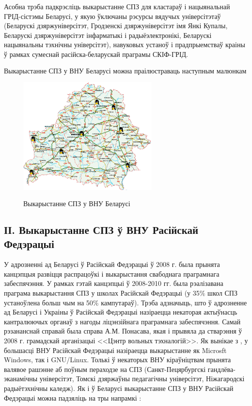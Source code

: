 \documentclass[10pt, a5paper]{article}
\begin{document}
Асобна трэба падкрэсліць выкарыстанне СПЗ для кластараў і нацыянальнай ГРІД-сістэмы Беларусі, у якую ўключаны рэсурсы вядучых універсітэтаў (Беларускі дзяржуніверсітэт, Гродзенскі дзяржуніверсітэт імя Янкі Купалы, Беларускі дзяржуніверсітэт інфарматыкі і радыёэлектронікі, Беларускі нацыянальны тэхнічны універсітэт), навуковых устаноў і прадпрыемстваў краіны ў рамках сумеснай расійска-беларускай праграмы СКІФ-ГРІД.

Выкарыстанне СПЗ у ВНУ Беларусі можна праілюстраваць наступным малюнкам

\begin{figure}[htpb]
  \centering
  \includegraphics[width=7cm]{03_2012_bilorus}
  \label{fig:Zlobin1}
  \caption{Выкарыстанне СПЗ у ВНУ Беларусі}
\end{figure}


\subsection*{ІІ. Выкарыстанне СПЗ ў ВНУ Расійскай Федэрацыі}

У адрозненні ад Беларусі ў Расійскай Федэрацыі ў 2008 г. была прынята канцэпцыя развіцця распрацоўкі і выкарыстання свабоднага праграмнага забеспячэння. У рамках гэтай канцэпцыі ў 2008-2010 гг. была рэалізавана праграма выкарыстання СПЗ у школах Расійскай Федэрацыі (у 35\% школ СПЗ устаноўлена больш чым на 50\% кампутараў). Трэба адзначыць, што ў адрозненне ад Беларусі і Украіны ў Расійскай Федэрацыі назіраецца некаторая актыўнасць кантралюючых органаў з нагоды ліцэнзійнага праграмнага забеспячэння. Самай рэзананснай справай была справа А.М. Понасава, якая і прывяла да стварэння ў 2008 г. грамадскай арганізацыі <<Цэнтр вольных тэхналогій>>. Як вынікае з  \cite{Zlobin1, Zlobin2, Zlobin3}, у большасці ВНУ Расійскай Федэрацыі назіраецца выкарыстанне як Microsft Windows, так і GNU/Linux. Толькі ў некаторых ВНУ кіраўніцтвам прынята валявое рашэнне аб поўным пераходзе на СПЗ (Санкт-Пецярбургскі гандлёва-эканамічны універсітэт, Томскі дзяржаўны педагагічны універсітэт, Ніжагародскі радыётэхнічны каледж). Як і ў Беларусі выкарыстанне СПЗ у ВНУ Расійскай Федэрацыі можна падзяліць на тры напрамкі \cite{Zlobin3, Zlobin4, Zlobin5}:
\end{document}
